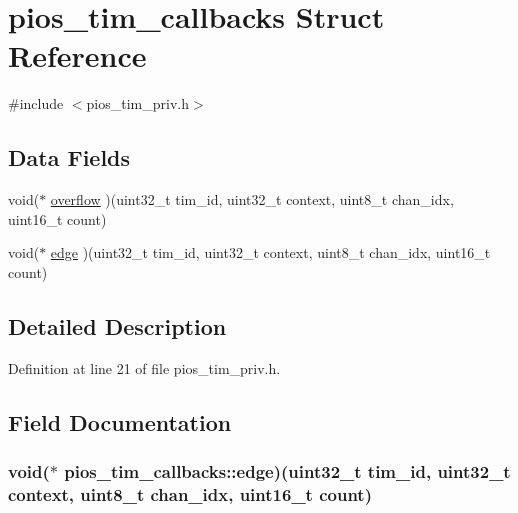 \hypertarget{structpios__tim__callbacks}{\section{pios\-\_\-tim\-\_\-callbacks \-Struct \-Reference}
\label{structpios__tim__callbacks}
}


{\ttfamily \#include $<$pios\-\_\-tim\-\_\-priv.\-h$>$}

\subsection*{\-Data \-Fields}
\begin{DoxyCompactItemize}
\item 
void($\ast$ \hyperlink{structpios__tim__callbacks_a7e55f8bf5b5867b790dc9bf1e929ac6f}{overflow} )(uint32\-\_\-t tim\-\_\-id, uint32\-\_\-t context, uint8\-\_\-t chan\-\_\-idx, uint16\-\_\-t count)
\item 
void($\ast$ \hyperlink{structpios__tim__callbacks_aba0c27c4d43db18366fe06221c7ccb87}{edge} )(uint32\-\_\-t tim\-\_\-id, uint32\-\_\-t context, uint8\-\_\-t chan\-\_\-idx, uint16\-\_\-t count)
\end{DoxyCompactItemize}


\subsection{\-Detailed \-Description}


\-Definition at line 21 of file pios\-\_\-tim\-\_\-priv.\-h.



\subsection{\-Field \-Documentation}
\hypertarget{structpios__tim__callbacks_aba0c27c4d43db18366fe06221c7ccb87}{
\subsubsection[{edge}]{\setlength{\rightskip}{0pt plus 5cm}void($\ast$ {\bf pios\-\_\-tim\-\_\-callbacks\-::edge})(uint32\-\_\-t tim\-\_\-id, uint32\-\_\-t context, uint8\-\_\-t chan\-\_\-idx, uint16\-\_\-t count)}}\label{structpios__tim__callbacks_aba0c27c4d43db18366fe06221c7ccb87}


